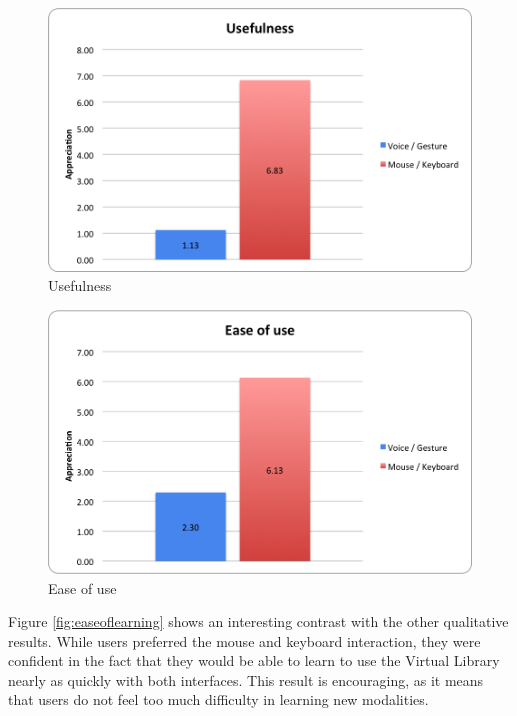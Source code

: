 \documentclass[a4paper, 10pt]{article}
\begin{document}
	\begin{figure}[h]
		\centering
			\includegraphics[scale=0.7]{graphs/usefulness.png}
		\caption{Usefulness}
		\label{fig:useful}
	\end{figure}
	
	\begin{figure}[h]
		\centering
			\includegraphics[scale=0.7]{graphs/ease_of_use.png}
		\caption{Ease of use}
		\label{fig:easeofuse}
	\end{figure}
	
	\par{Figure \ref{fig:easeoflearning} shows an interesting contrast with the other qualitative results. While users preferred the mouse and keyboard interaction, they were confident in the fact that they would be able to learn to use the Virtual Library nearly as quickly with both interfaces. This result is encouraging, as it means that users do not feel too much difficulty in learning new modalities.}
	
\end{document}
